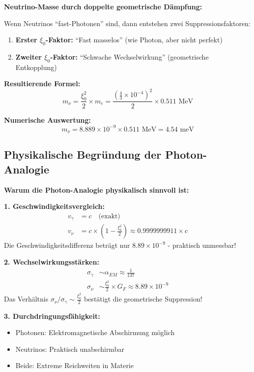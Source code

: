\documentclass[12pt,a4paper]{article}
\begin{document}
	\begin{keyresult}
		\textbf{Neutrino-Masse durch doppelte geometrische Dämpfung:}
		
		Wenn Neutrinos ``fast-Photonen'' sind, dann entstehen zwei Suppressionsfaktoren:
		
		\begin{enumerate}
			\item \textbf{Erster $\xi_0$-Faktor:} ``Fast masselos'' (wie Photon, aber nicht perfekt)
			\item \textbf{Zweiter $\xi_0$-Faktor:} ``Schwache Wechselwirkung'' (geometrische Entkopplung)
		\end{enumerate}
		
		\textbf{Resultierende Formel:}
		\begin{equation}
			\boxed{m_\nu = \frac{\xi_0^2}{2} \times m_e = \frac{(\frac{4}{3} \times 10^{-4})^2}{2} \times 0.511 \text{ MeV}}
		\end{equation}
		
		\textbf{Numerische Auswertung:}
		\begin{equation}
			m_\nu = 8.889 \times 10^{-9} \times 0.511 \text{ MeV} = 4.54 \text{ meV}
		\end{equation}
	\end{keyresult}
	
	\subsection{Physikalische Begründung der Photon-Analogie}
	
	\begin{photon}
		\textbf{Warum die Photon-Analogie physikalisch sinnvoll ist:}
		
		\textbf{1. Geschwindigkeitsvergleich:}
		\begin{align}
			v_\gamma &= c \quad \text{(exakt)} \\
			v_\nu &= c \times \left(1 - \frac{\xi_0^2}{2}\right) \approx 0.9999999911 \times c
		\end{align}
		Die Geschwindigkeitsdifferenz beträgt nur $8.89 \times 10^{-9}$ - praktisch unmessbar!
		
		\textbf{2. Wechselwirkungsstärken:}
		\begin{align}
			\sigma_\gamma &\sim \alpha_{EM} \approx \frac{1}{137} \\
			\sigma_\nu &\sim \frac{\xi_0^2}{2} \times G_F \approx 8.89 \times 10^{-9}
		\end{align}
		Das Verhältnis $\sigma_\nu/\sigma_\gamma \sim \frac{\xi_0^2}{2}$ bestätigt die geometrische Suppression!
		
		\textbf{3. Durchdringungsfähigkeit:}
		\begin{itemize}
			\item Photonen: Elektromagnetische Abschirmung möglich
			\item Neutrinos: Praktisch unabschirmbar
			\item Beide: Extreme Reichweiten in Materie
		\end{itemize}
	\end{photon}
	
\end{document}
